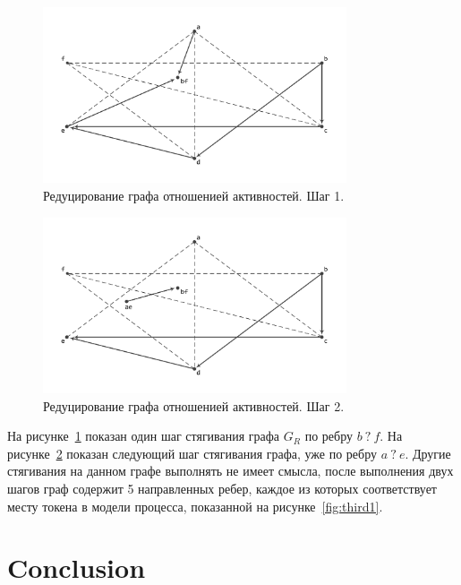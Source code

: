 \documentclass[
11pt,%
tightenlines,%
twoside,%
onecolumn,%
nofloats,%
nobibnotes,%
nofootinbib,%
superscriptaddress,%
noshowpacs,%
centertags]%
{revtex4}
\begin{document}
\begin{figure}[h]
\setcaptionmargin{5mm}
\includegraphics[width=0.8\textwidth]{pics/g_r_reduce1.pdf}
\caption{Редуцирование графа отношенией активностей. Шаг 1.}
\label{fig:g_r_reduce1}
\end{figure}

\begin{figure}[h]
\setcaptionmargin{5mm}
\includegraphics[width=0.8\textwidth]{pics/g_r_reduce2.pdf}
\caption{Редуцирование графа отношенией активностей. Шаг 2.}
\label{fig:g_r_reduce2}
\end{figure}

На рисунке~\ref{fig:g_r_reduce1} показан один шаг стягивания графа $G_R$ по ребру $b \ ? \ f$.
На рисунке~\ref{fig:g_r_reduce2} показан следующий шаг стягивания графа, уже по ребру $a \ ? \ e$.
Другие стягивания на данном графе выполнять не имеет смысла, после выполнения двух шагов граф содержит 5 направленных ребер, каждое из которых соответствует месту токена в модели процесса, показанной на рисунке~\ref{fig:third1}.

\section{Conclusion}
\end{document}
